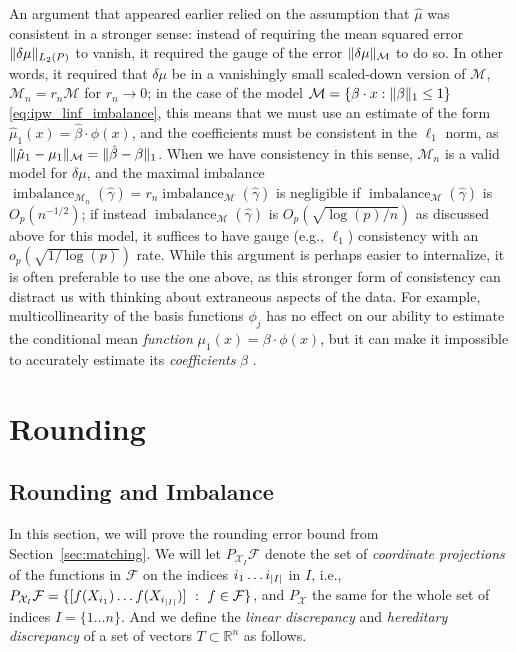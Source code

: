 \documentclass{article}
\DeclarePairedDelimiter\norm{\lVert}{\rVert}
\DeclarePairedDelimiter\abs{\lvert}{\rvert}
\DeclarePairedDelimiter\set{\{}{\}}
\theoremstyle{definition}
\newcommand{\R}{\ensuremath{\mathbb{R}}}
\newcommand{\calF}{\ensuremath{\mathcal{F}}}
\newcommand{\calX}{\ensuremath{\mathcal{X}}}
\newcommand{\dm}{\delta \mu}
\DeclareMathOperator{\imbalance}{imbalance}
\newcommand{\hgamma}{\ensuremath{\hat\gamma}}
\newcommand{\model}{\mathcal{M}}
\newcommand{\<}{\langle}
\renewcommand{\>}{\rangle}
\begin{document}
\begin{refsection}
An argument that appeared earlier  \citep[e.g., in][]{athey2018approximate, kallus2020generalized, wong2018kernel}
relied on the assumption that $\hat \mu$ was consistent in a stronger sense:
instead of requiring the mean squared error $\norm{\dm}_{L_2(P)}$ to vanish, it required the gauge of the error $\norm{\dm}_{\model}$ to do so.
In other words, it required that $\dm$ be in a vanishingly small scaled-down version of $\model$, $\model_n = r_n \model$ for $r_n \to 0$;
in the case of the model $\model = \set{ \beta \cdot x : \norm{\beta}_1 \le 1}$ \eqref{eq:ipw_linf_imbalance}, this means that we must use an estimate of the form
$\hat \mu_1(x) = \hat\beta \cdot \phi(x)$, and the coefficients must be consistent in the $\ell_1$ norm, as $\norm{\hat \mu_1-\mu_1}_{\model} = \norm{\hat\beta-\beta}_1$.
When we have consistency in this sense, $\model_n$ is a valid model for $\dm$,
and the maximal imbalance $\imbalance_{\model_n}(\hgamma) = r_n \imbalance_{\model}(\hgamma)$ is negligible
if $\imbalance_{\model}(\hgamma)$ is $O_p(n^{-1/2})$;
if instead $\imbalance_{\model}(\hgamma)$ is $O_p(\sqrt{\log(p) / n})$ as discussed above for this model,
it suffices to have gauge (e.g., $\ell_1$) consistency with an $o_p(\sqrt{1/\log(p)})$ rate.
While this argument is perhaps easier to internalize, it is often preferable to use the one above,
as  this stronger form of consistency can distract us with thinking about extraneous aspects of the data.
For example, multicollinearity of the basis functions $\phi_j$
has no effect on our ability to estimate the conditional mean \emph{function} $\mu_1(x)=\beta \cdot \phi(x)$,
but it can make it impossible to accurately estimate its \emph{coefficients} $\beta$
\citep[see, e.g.,][]{chatterjee2013assumptionless}.

\section{Rounding}
\label{app:rounding}

\subsection{Rounding and Imbalance}

In this section, we will prove the rounding error bound from Section~\ref{sec:matching}. We will let $P_{\calX_I} \calF$ denote the set of \emph{coordinate projections} of the functions in $\calF$ on the indices $i_1 \ldots i_{\abs{I}}$ in $I$, i.e., $P_{\calX_I}\calF = \{ [f(X_{i_1}) \ldots f(X_{i_{\abs{I}}})] \ : \ f \in \calF \}$, and $P_{\calX}$ the same for the whole set of indices $I=\{1 \ldots n\}$. And we define the \emph{linear discrepancy} and \emph{hereditary discrepancy} of a set of vectors $T \subset \R^n$ as follows.


\end{refsection}
\end{document}
